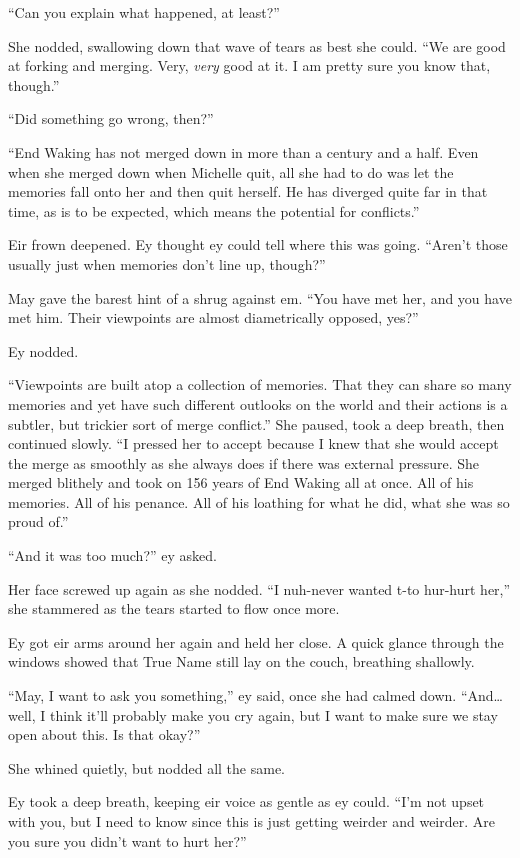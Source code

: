 ``Can you explain what happened, at least?''

She nodded, swallowing down that wave of tears as best she could. ``We are good at forking and merging. Very, \emph{very} good at it. I am pretty sure you know that, though.''

``Did something go wrong, then?''

``End Waking has not merged down in more than a century and a half. Even when she merged down when Michelle quit, all she had to do was let the memories fall onto her and then quit herself. He has diverged quite far in that time, as is to be expected, which means the potential for conflicts.''

Eir frown deepened. Ey thought ey could tell where this was going. ``Aren't those usually just when memories don't line up, though?''

May gave the barest hint of a shrug against em. ``You have met her, and you have met him. Their viewpoints are almost diametrically opposed, yes?''

Ey nodded.

``Viewpoints are built atop a collection of memories. That they can share so many memories and yet have such different outlooks on the world and their actions is a subtler, but trickier sort of merge conflict.'' She paused, took a deep breath, then continued slowly. ``I pressed her to accept because I knew that she would accept the merge as smoothly as she always does if there was external pressure. She merged blithely and took on 156 years of End Waking all at once. All of his memories. All of his penance. All of his loathing for what he did, what she was so proud of.''

``And it was too much?'' ey asked.

Her face screwed up again as she nodded. ``I nuh-never wanted t-to hur-hurt her,'' she stammered as the tears started to flow once more.

Ey got eir arms around her again and held her close. A quick glance through the windows showed that True Name still lay on the couch, breathing shallowly.

``May, I want to ask you something,'' ey said, once she had calmed down. ``And\ldots well, I think it'll probably make you cry again, but I want to make sure we stay open about this. Is that okay?''

She whined quietly, but nodded all the same.

Ey took a deep breath, keeping eir voice as gentle as ey could. ``I'm not upset with you, but I need to know since this is just getting weirder and weirder. Are you sure you didn't want to hurt her?''


